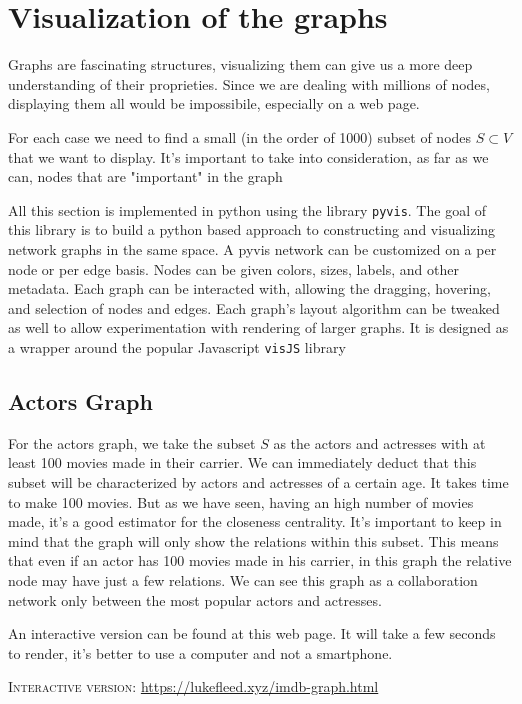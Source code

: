 \section{Visualization of the graphs}
Graphs are fascinating structures, visualizing them can give us a more deep understanding of their proprieties. Since we are dealing with millions of nodes, displaying them all would be impossibile, especially on a web page. \s

\nd For each case we need to find a small (in the order of 1000) subset of nodes $S \subset V$ that we want to display. It's important to take into consideration, as far as we can, nodes that are "important" in the graph \s

\nd All this section is implemented in python using the library \texttt{pyvis}. The goal of this library is to build a python based approach to constructing and visualizing network graphs in the same space. A pyvis network can be customized on a per node or per edge basis. Nodes can be given colors, sizes, labels, and other metadata. Each graph can be interacted with, allowing the dragging, hovering, and selection of nodes and edges. Each graph's layout algorithm can be tweaked as well to allow experimentation with rendering of larger graphs. It is designed as a wrapper around the popular Javascript \texttt{visJS} library

\subsection{Actors Graph} \label{actors-graph-vis}
For the actors graph, we take the subset $S$ as the actors and actresses with at least 100 movies made in their carrier. We can immediately deduct that this subset will be characterized by actors and actresses of a certain age. It takes time to make 100 movies. But as we have seen, having an high number of movies made, it's a good estimator for the closeness centrality. It's important to keep in mind that the graph will only show the relations within this subset. This means that even if an actor has 100 movies made in his carrier, in this graph the relative node may have just a few relations. We can see this graph as a collaboration network only between the most popular actors and actresses. \s

\nd An interactive version can be found at this web page. It will take a few seconds to render, it's better to use a computer and not a smartphone. \s

\textsc{Interactive version}: \url{https://lukefleed.xyz/imdb-graph.html}

